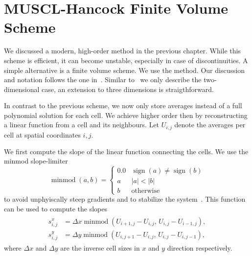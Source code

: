 \section{MUSCL-Hancock Finite Volume Scheme}\label{sec:muscl}
\newcommand{\cellAvg}[1][i,j]{U_{#1}}
\newcommand{\sign}{\operatorname{sign}}
\newcommand{\minmod}{\operatorname{minmod}}
\newcommand{\slope}[2][i,j]{s^{#2}_{#1}}
\newcommand{\gradCellAvg}[1][i,j]{\gradient{\cellAvg[#1]}}
\newcommand{\fluxX}{\flux_x}
\newcommand{\fluxY}{\flux_y}
We discussed a modern, high-order \dg{} method in the previous chapter.
While this scheme is efficient, it can become unstable, especially in case of discontinuities.
A simple alternative is a finite volume scheme.
We use the \muscl{} method.
Our discussion and notation follows the one in~\cite{toro2009riemann}.
Similar to~\cite{toro2009riemann} we only describe the two-dimensional case, an extension to three dimensions is straigthforward.

In contrast to the previous \dg{} scheme, we now only store averages instead of a full polynomial solution for each cell.
We achieve higher order then by reconstructing a linear function from a cell and its neighbours.
Let $\cellAvg$ denote the averages per cell at spatial coordinates $i,j$.

We first compute the slope of the linear function connecting the cells.
We use the minmod slope-limiter
\begin{equation}
  \label{eq:minmod}
  \operatorname{minmod}(a, b) =
  \begin{cases}
    0.0 & \sign(a) \neq \sign(b) \\
      a & \vert a \vert < \vert b \vert \\
      b & \text{otherwise}
  \end{cases}
\end{equation}
to avoid unphyiscally steep gradients and to stabilize the system~\cite{leVeque2002finite}.
This function can be used to compute the slopes
\begin{align}\label{eq:slopes}
  \begin{split}
   \slope{x} &=  \Delta x \minmod \left( \cellAvg[i+1,j] - \cellAvg[i,j], \, \cellAvg[i,j] - \cellAvg[i-1, j] \right),\\ 
   \slope{y} &=  \Delta y \minmod \left( \cellAvg[i,j+1] - \cellAvg[i,j], \, \cellAvg[i,j] - \cellAvg[i, j-1] \right),
   \end{split}
\end{align}
where $\Delta x$ and $\Delta y$ are the inverse cell sizes in $x$ and $y$ direction respectively.

